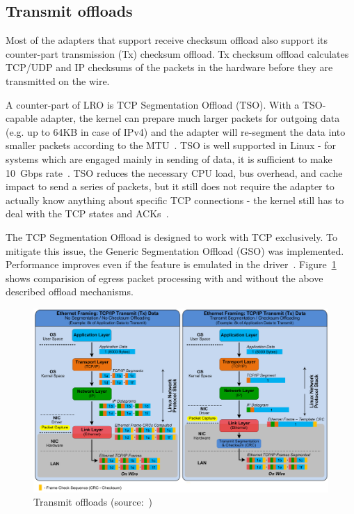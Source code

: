 
\subsection{Transmit offloads}
Most of the adapters that support receive checksum offload
also support its counter-part transmission (Tx) checksum offload.
Tx checksum offload calculates TCP/UDP and
IP checksums of the packets in the hardware before they are transmitted on the wire.

A counter-part of LRO is TCP Segmentation Offload (TSO).
With a TSO-capable adapter, the kernel can prepare much larger packets for outgoing data
(e.g. up to 64KB in case of IPv4) and the adapter will re-segment the data into smaller packets according to the MTU~\cite{jls2009-gro}.
TSO is well supported in Linux -
for systems which are engaged mainly in sending of data,
it is sufficient to make 10~Gbps rate~\cite{jls2009-gro}.
TSO reduces the necessary CPU load, bus overhead, and cache impact to send a series of packets,
but it still does not require the adapter to actually know
anything about specific TCP connections -
the kernel still has to deal with the TCP states and ACKs~\cite{linux-and-tcp-offload-engines}.

The TCP Segmentation Offload is designed to work with TCP exclusively.
To mitigate this issue, the Generic Segmentation Offload (GSO) was implemented.
Performance improves even if the feature is emulated in the driver~\cite{jls2009-gro}.
Figure~\ref{fig:linux-tx-offloads} shows comparision of egress packet processing
with and without the above described offload mechanisms.
\begin{figure}
	\centering
	\includegraphics[width=15cm,keepaspectratio]{fig/tx-offloads.png}
	\caption{Transmit offloads (source:~\cite{nst-offloads})}
	\label{fig:linux-tx-offloads}
	\bigskip
\end{figure}
